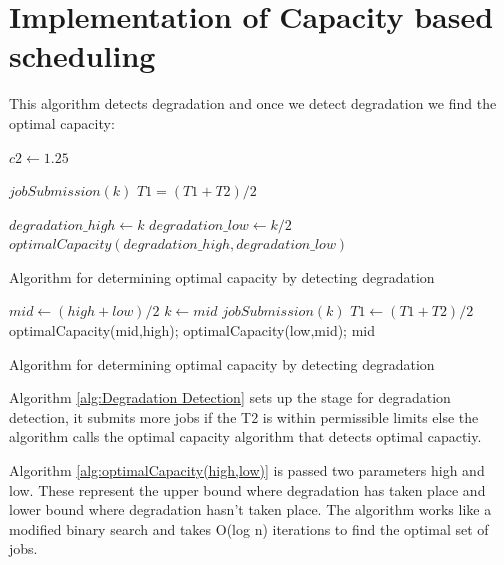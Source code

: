 \documentclass[ms,electronic,double]{nuthesis}
\begin{document}
\section{Implementation of Capacity based scheduling}

This algorithm detects degradation and once we detect degradation we find the 
optimal capacity:

\begin{algorithm}
\begin{algorithmic}
\STATE $c2 \gets 1.25$ 

  \STATE $jobSubmission(k)$ 
  \STATE $T1=(T1+T2)/2$
\ENDIF

  \STATE $degradation\_high \gets k$
  \STATE $degradation\_low \gets k/2$
  \STATE $optimalCapacity(degradation\_high,degradation\_low)$
\ENDIF

\ENDWHILE

\end{algorithmic}
\caption{Algorithm for determining optimal capacity by detecting degradation}
\label{alg:Degradation Detection}
\end{algorithm}


\begin{algorithm}
\begin{algorithmic}

\STATE $mid \gets (high+low)/2$ 
\STATE $k \gets mid$
\STATE $jobSubmission(k)$ 
\STATE $T1 \gets (T1+T2)/2$
\STATE optimalCapacity(mid,high);
\ENDIF  
{}
\STATE optimalCapacity(low,mid);
\ENDIF
\RETURN mid
\end{algorithmic}
\caption{Algorithm for determining optimal capacity by detecting degradation}
\label{alg:optimalCapacity(high,low)}
\end{algorithm}

Algorithm \ref{alg:Degradation Detection} sets up the stage for degradation 
detection, it submits more jobs if the T2 is within permissible limits else the 
algorithm calls the optimal capacity algorithm that detects optimal capactiy.

Algorithm \ref{alg:optimalCapacity(high,low)} is passed two parameters high and 
low. These represent the upper bound where degradation has taken place and lower bound 
where degradation hasn't taken place. The algorithm works like a modified binary 
search and takes O(log n) iterations to find the optimal set of jobs.
\end{document}
